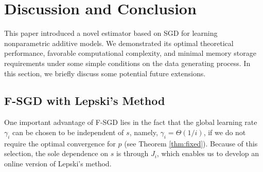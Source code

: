 \section{Discussion and Conclusion}\label{sec:discuss}
This paper introduced a novel estimator based on SGD for learning  nonparametric additive models.  We demonstrated its optimal theoretical performance, favorable computational complexity, and minimal memory storage requirements under some simple conditions on the data generating process. In this section, we briefly discuss some potential future extensions.  
\subsection{F-SGD with Lepski's Method}\label{subsec:Lepski}
One important advantage of F-SGD lies in the fact that the global learning rate $ \gamma_i $ can be chosen to be independent of $ s $, namely, $\gamma_i = \Theta(1/i)$, if we do not require the optimal convergence for $p$ (see Theorem \ref{thm:fixed}). 
Because of this selection, the sole dependence on $ s $ is through $ J_i $, which enables us to develop an online version of Lepski's method.

